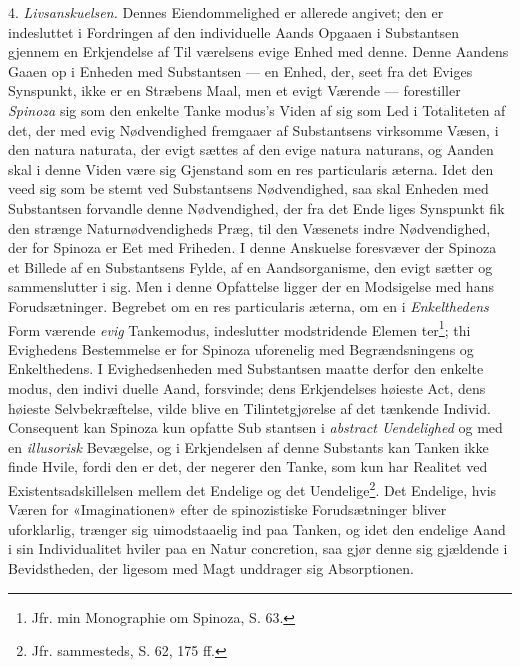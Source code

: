 4. \emph{Livsanskuelsen.} Dennes Eiendommelighed er allerede
angivet; den er indesluttet i Fordringen af den individuelle
Aands Opgaaen i Substantsen gjennem en Erkjendelse af Til\-%
værelsens evige Enhed med denne. Denne Aandens Gaaen op
i Enheden med Substantsen --- en Enhed, der, seet fra det
Eviges Synspunkt, ikke er en Stræbens Maal, men et evigt
Værende --- forestiller \emph{Spinoza} sig som den enkelte Tanke\-%
modus's Viden af sig som Led i Totaliteten af det, der med
evig Nødvendighed fremgaaer af Substantsens virksomme Væsen,
i den natura naturata, der evigt sættes af den evige natura
naturans, og Aanden skal i denne Viden være sig Gjenstand
som en res particularis æterna. Idet den veed sig som be\-%
stemt ved Substantsens Nødvendighed, saa skal Enheden med
Substantsen forvandle denne Nødvendighed, der fra det Ende\-%
liges Synspunkt fik den strænge Naturnødvendigheds Præg,
\setcounter{footnote}{0}%
til den Væsenets indre Nødvendighed, der for Spinoza er Eet
med Friheden. I denne Anskuelse foresvæver der Spinoza et
Billede af en Substantsens Fylde, af en Aandsorganisme, den
evigt sætter og sammenslutter i sig. Men i denne Opfattelse
ligger der en Modsigelse med hans Forudsætninger. Begrebet
om en res particularis æterna, om en i \emph{Enkelthedens} Form
værende \emph{evig} Tankemodus, indeslutter modstridende Elemen\-%
ter\footnote{Jfr. min Monographie om Spinoza, S. 63.}; thi Evighedens Bestemmelse er for Spinoza uforenelig
med Begrændsningens og Enkelthedens. I Evighedsenheden
med Substantsen maatte derfor den enkelte modus, den indivi\-%
duelle Aand, forsvinde; dens Erkjendelses høieste Act, dens
høieste Selvbekræftelse, vilde blive en Tilintetgjørelse af det
tænkende Individ. Consequent kan Spinoza kun opfatte Sub\-%
stantsen i \emph{abstract Uendelighed} og med en \emph{illusorisk}
Bevægelse, og i Erkjendelsen af denne Substants kan Tanken
ikke finde Hvile, fordi den er det, der negerer den Tanke,
som kun har Realitet ved Existentsadskillelsen mellem det
Endelige og det Uendelige\footnote{Jfr. sammesteds, S. 62, 175 ff.}. Det Endelige, hvis Væren for
«Imaginationen» efter de spinozistiske Forudsætninger bliver
uforklarlig, trænger sig uimodstaaelig ind paa Tanken, og idet
den endelige Aand i sin Individualitet hviler paa en Natur\-%
concretion, saa gjør denne sig gjældende i Bevidstheden, der
ligesom med Magt unddrager sig Absorptionen.

